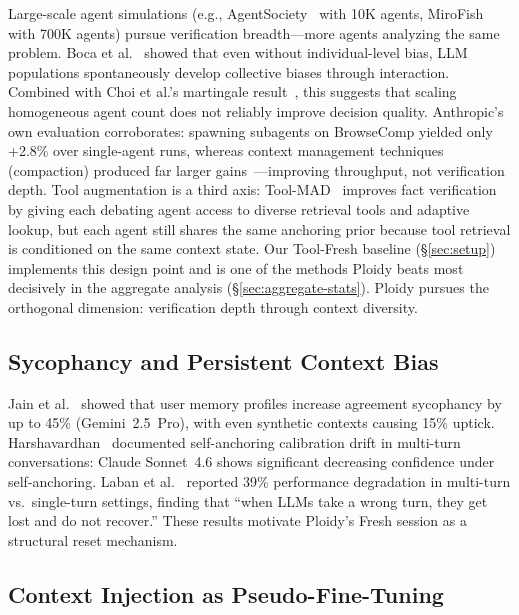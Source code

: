\documentclass[11pt]{article}
\begin{document}
Large-scale agent simulations (e.g., AgentSociety~\citep{pang2025agentsociety} with 10K agents, MiroFish with 700K agents) pursue verification breadth---more agents analyzing the same problem. Boca et al.~\citep{boca2025emergent} showed that even without individual-level bias, LLM populations spontaneously develop collective biases through interaction. Combined with Choi et al.'s martingale result~\citep{choi2025debate}, this suggests that scaling homogeneous agent count does not reliably improve decision quality. Anthropic's own evaluation corroborates: spawning subagents on BrowseComp yielded only +2.8\% over single-agent runs, whereas context management techniques (compaction) produced far larger gains~\citep{anthropic2026harnessing}---improving throughput, not verification depth. Tool augmentation is a third axis: Tool-MAD~\citep{jeong2026toolmad} improves fact verification by giving each debating agent access to diverse retrieval tools and adaptive lookup, but each agent still shares the same anchoring prior because tool retrieval is conditioned on the same context state. Our Tool-Fresh baseline (\S\ref{sec:setup}) implements this design point and is one of the methods Ploidy beats most decisively in the aggregate analysis (\S\ref{sec:aggregate-stats}). Ploidy pursues the orthogonal dimension: verification depth through context diversity.

\subsection{Sycophancy and Persistent Context Bias}
\label{sec:sycophancy}

Jain et al.~\citep{jain2025sycophancy} showed that user memory profiles increase agreement sycophancy by up to 45\% (Gemini~2.5~Pro), with even synthetic contexts causing 15\% uptick. Harshavardhan~\citep{harshavardhan2026sacd} documented self-anchoring calibration drift in multi-turn conversations: Claude Sonnet~4.6 shows significant decreasing confidence under self-anchoring. Laban et al.~\citep{laban2025lost} reported 39\% performance degradation in multi-turn vs.\ single-turn settings, finding that ``when LLMs take a wrong turn, they get lost and do not recover.'' These results motivate Ploidy's Fresh session as a structural reset mechanism.

\subsection{Context Injection as Pseudo-Fine-Tuning}
\label{sec:injection-related}
\end{document}
